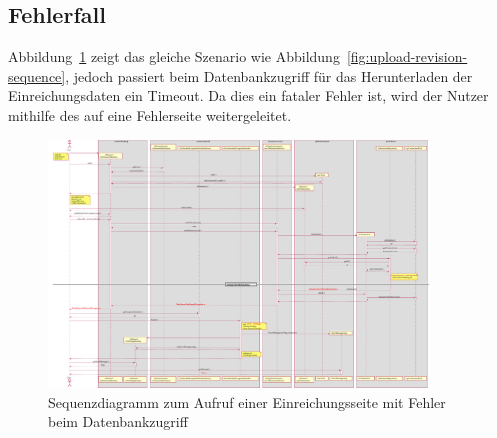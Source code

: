 \subsection{Fehlerfall}\label{subsec:fehlerfall}

Abbildung~\ref{fig:upload-revision-sequence-failure} zeigt das gleiche Szenario wie Abbildung~\ref{fig:upload-revision-sequence},
jedoch passiert beim Datenbankzugriff für das Herunterladen der Einreichungsdaten ein Timeout.
Da dies ein fataler Fehler ist, wird der Nutzer mithilfe des  auf eine Fehlerseite weitergeleitet.

\begin{figure}[H]
    \centering
    \includegraphics[width=0.9\textwidth]{graphics/upload_revision_failure}
    \caption{Sequenzdiagramm zum Aufruf einer Einreichungsseite mit Fehler beim Datenbankzugriff}
    \label{fig:upload-revision-sequence-failure}
\end{figure}
